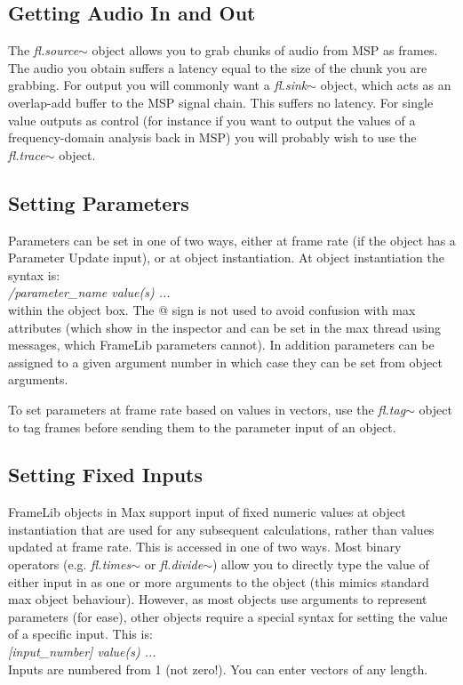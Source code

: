 \documentclass{article}
\newcommand{\flobject}[1]{\textit{fl.#1$\sim$}}
\begin{document}
\subsection{Getting Audio In and Out}

The \flobject{source} object allows you to grab chunks of audio from MSP as frames. The audio you obtain suffers a latency equal to the size of the chunk you are grabbing. For output you will commonly want a \flobject{sink} object, which acts as an overlap-add buffer to the MSP signal chain. This suffers no latency. For single value outputs as control (for instance if you want to output the values of a frequency-domain analysis back in MSP) you will probably wish to use the \flobject{trace} object.

\subsection{\label{sec:setparams}Setting Parameters}

Parameters can be set in one of two ways, either at frame rate (if the object has a Parameter Update input), or at object instantiation. At object instantiation the syntax is: \\
\-\hspace{4ex} \textit{/parameter\_name value(s) ...} \\ 
within the object box. The @ sign is not used to avoid confusion with max attributes (which show in the inspector and can be set in the max thread using messages, which FrameLib parameters cannot). In addition parameters can be assigned to a given argument number in which case they can be set from object arguments.

To set parameters at frame rate based on values in vectors, use the \flobject{tag} object to tag frames before sending them to the parameter input of an object.

\subsection{Setting Fixed Inputs}

FrameLib objects in Max support input of fixed numeric values at object instantiation that are used for any subsequent calculations, rather than values updated at frame rate. This is accessed in one of two ways. Most binary operators (e.g. \flobject{times} or \flobject{divide}) allow you to directly type the value of either input in as one or more arguments to the object (this mimics standard max object behaviour). However, as most objects use arguments to represent parameters (for ease), other objects require a special syntax for setting the value of a specific input. This is:\\
\-\hspace{4ex} \textit{[input\_number] value(s) ...} \\ 
Inputs are numbered from 1 (not zero!). You can enter vectors of any length.
\end{document}
